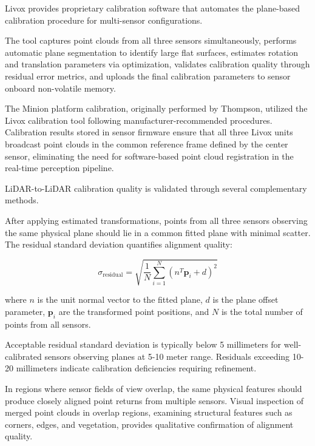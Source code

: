 \documentclass{erauthesis}
\begin{document}

Livox provides proprietary calibration software that automates the plane-based calibration procedure for multi-sensor configurations.

The tool captures point clouds from all three sensors simultaneously, performs automatic plane segmentation to identify large flat surfaces, estimates rotation and translation parameters via optimization, validates calibration quality through residual error metrics, and uploads the final calibration parameters to sensor onboard non-volatile memory.

The Minion platform calibration, originally performed by Thompson, utilized the Livox calibration tool following manufacturer-recommended procedures.
Calibration results stored in sensor firmware ensure that all three Livox units broadcast point clouds in the common reference frame defined by the center sensor, eliminating the need for software-based point cloud registration in the real-time perception pipeline.


LiDAR-to-LiDAR calibration quality is validated through several complementary methods.


After applying estimated transformations, points from all three sensors observing the same physical plane should lie in a common fitted plane with minimal scatter.
The residual standard deviation quantifies alignment quality:

$$\sigma_{\text{residual}} = \sqrt{\frac{1}{N}\sum_{i=1}^{N} (n^T \mathbf{p}_i + d)^2}$$

where $n$ is the unit normal vector to the fitted plane, $d$ is the plane offset parameter, $\mathbf{p}_i$ are the transformed point positions, and $N$ is the total number of points from all sensors.

Acceptable residual standard deviation is typically below 5 millimeters for well-calibrated sensors observing planes at 5-10 meter range.
Residuals exceeding 10-20 millimeters indicate calibration deficiencies requiring refinement.


In regions where sensor fields of view overlap, the same physical features should produce closely aligned point returns from multiple sensors.
Visual inspection of merged point clouds in overlap regions, examining structural features such as corners, edges, and vegetation, provides qualitative confirmation of alignment quality.
\end{document}
